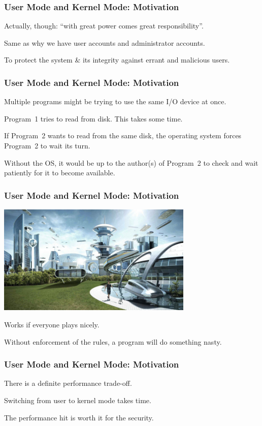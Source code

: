 \begin{frame}
	\frametitle{User Mode and Kernel Mode: Motivation}


	Actually, though: ``with great power comes great responsibility''.


	Same as why we have user accounts and administrator accounts.

	To protect the system \& its integrity against errant and malicious users.


\end{frame}

\begin{frame}
	\frametitle{User Mode and Kernel Mode: Motivation}

	Multiple programs might be trying to use the same I/O device at once.

	Program~1 tries to read from disk. This takes some time.

	If Program~2 wants to read from the same disk, the operating system forces Program~2 to wait its turn.

	Without the OS, it would be up to the author(s) of Program~2 to check and wait patiently for it to become available.

\end{frame}

\begin{frame}
	\frametitle{User Mode and Kernel Mode: Motivation}
	
	\begin{center}
	\includegraphics[width=0.7\textwidth]{images/worldif.jpg}
	\end{center}

	Works if everyone plays nicely.

	Without enforcement of the rules, a program will do something nasty.

\end{frame}

\begin{frame}
	\frametitle{User Mode and Kernel Mode: Motivation}

	There is a definite performance trade-off.

	Switching from user to kernel mode takes time.

	The performance hit is worth it for the security.

\end{frame}

